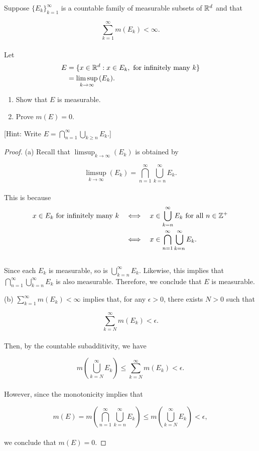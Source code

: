 \documentclass[12pt, a4paper, openany, twoside]{book}
\theoremstyle{definition}
\theoremstyle{remark}
\theoremstyle{plain}
\numberwithin{equation}{section}
\begin{document}
\newpage

\begin{tcolorbox}[colback=yellow!10!white,colframe=gray!75!black,title=Exercise 1.16]\label{Exercise 1.16}
    Suppose $\{E_k\}_{k=1}^{\infty}$ is a countable family of measurable subsets of ${\mathbb {R}}^d$ and that

    \[\sum_{k=1}^{\infty}{m(E_k)}<\infty.\]
    \\
    Let 
    \begin{align*}
        E &= \{x\in{\mathbb {R}}^d: x\in E_k,\ \text{for infinitely many $k$}\}\\
        &= \limsup_{k\rightarrow\infty}{(E_k)}.
    \end{align*}
    \begin{enumerate}
        \item [(a)] Show that $E$ is measurable.
        \item [(b)] Prove $m(E)=0$.
    \end{enumerate}
    [Hint: Write $E=\bigcap_{n=1}^{\infty}{\bigcup_{k\geq n}{E_k}}$.]
\end{tcolorbox}
\begin{proof}
    (a) Recall that $\limsup_{k\rightarrow\infty}(E_k)$ is obtained by

    \[\limsup_{k\rightarrow\infty}(E_k)=\bigcap_{n=1}^{\infty}{\bigcup_{k=n}^{\infty}{E_k}}.\]
    \\
    This is because 
    \begin{align*}
        \text{$x\in E_k$ for infinitely many $k$}\quad&\Longleftrightarrow\quad x\in\bigcup_{k=n}^{\infty}{E_k}\ \text{for all $n\in\BZ^+$}\\
        &\Longleftrightarrow\quad x\in\bigcap_{n=1}^{\infty}{\bigcup_{k=n}^{\infty}{E_k}}.
    \end{align*}
    \\
    Since each $E_k$ is measurable, so is $\bigcup_{k=n}^{\infty}{E_k}$. Likewise, this implies that $\bigcap_{n=1}^{\infty}{\bigcup_{k=n}^{\infty}{E_k}}$ is also measurable. Therefore, we conclude that $E$ is measurable.

    \vspace{5mm}
    (b) $\sum_{k=1}^{\infty}{m(E_k)}<\infty$ implies that, for any $\epsilon>0$, there exists $N>0$ such that
    
    \[\sum_{k=N}^{\infty}{m(E_k)}<\epsilon.\]
    \\
    Then, by the countable subadditivity, we have

    \[m\left(\bigcup_{k=N}^{\infty}{E_k}\right)\leq\sum_{k=N}^{\infty}{m(E_k)}<\epsilon.\]
    \\
    However, since the monotonicity implies that

    \[m(E)=m\left(\bigcap_{n=1}^{\infty}{\bigcup_{k=n}^{\infty}{E_k}}\right)\leq m\left(\bigcup_{k=N}^{\infty}{E_k}\right)<\epsilon,\]
    \\
    we conclude that $m(E)=0$.
\end{proof}
\end{document}
